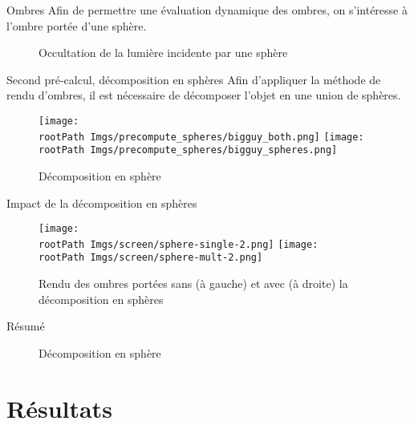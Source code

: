 \documentclass{beamer}
\newcommand*{\rootPath}{}
\begin{document}
\begin{frame}{Ombres}
	Afin de permettre une évaluation dynamique des ombres, on s’intéresse à l'ombre portée d'une sphère.
	\begin{figure}[!ht]
		\centering
		
		\caption{Occultation de la lumière incidente par une sphère}
	\end{figure}	
\end{frame}	

\begin{frame}{Second pré-calcul, décomposition en sphères}
	Afin d'appliquer la méthode de rendu d'ombres, il est nécessaire de décomposer l'objet en une union de sphères.
	\begin{figure}[!ht]
		\centering
			\texttt{[image: \\rootPath Imgs/precompute\_spheres/bigguy\_both.png]}
			\hspace{0.5cm}
			\texttt{[image: \\rootPath Imgs/precompute\_spheres/bigguy\_spheres.png]}
		\caption{Décomposition en sphère}
	\end{figure}	
\end{frame}	

\begin{frame}{Impact de la décomposition en sphères}
	\begin{figure}
		\centering
			\texttt{[image: \\rootPath Imgs/screen/sphere-single-2.png]}
			\texttt{[image: \\rootPath Imgs/screen/sphere-mult-2.png]}
		\caption{Rendu des ombres portées sans (à gauche) et avec (à droite) la décomposition en sphères}
	\end{figure}
\end{frame}

\begin{frame}{Résumé}
	\begin{figure}[!ht]
		\centering
			
		\caption{Décomposition en sphère}
	\end{figure}	
\end{frame}	


\section{Résultats}
\end{document}
